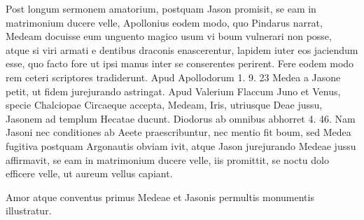 \documentclass[landscape, a4paper, 11pt, oneside, polutonikogreek, german]{article}
\begin{document}
Post longum sermonem amatorium, postquam Jason promisit, se eam in matrimonium ducere velle, Apollonius eodem modo, quo Pindarus narrat, Medeam docuisse eum unguento magico usum vi boum vulnerari non posse, atque si viri armati e dentibus draconis enascerentur, lapidem iuter eos jaciendum esse, quo facto fore ut ipsi manus inter se conserentes perirent. Fere eodem modo rem ceteri scriptores tradiderunt. Apud Apollodorum 1. 9. 23 Medea a Jasone petit, ut fidem jurejurando astringat. Apud Valerium Flaccum Juno et Venus, specie Chalciopae Circaeque accepta, Medeam, Iris, utriusque Deae jussu, Jasonem ad templum Hecatae ducunt. Diodorus ab omnibus abhorret 4. 46. Nam Jasoni nec conditiones ab Aeete praescribuntur, nec mentio fit boum, sed Medea fugitiva postquam Argonautis obviam ivit, atque Jason jurejurando Medeae jussu affirmavit, se eam in matrimonium ducere velle, iis promittit, se noctu dolo efficere velle, ut aureum vellus capiant.

Amor atque conventus primus Medeae et Jasonis permultis monumentis illustratur.
\end{document}
